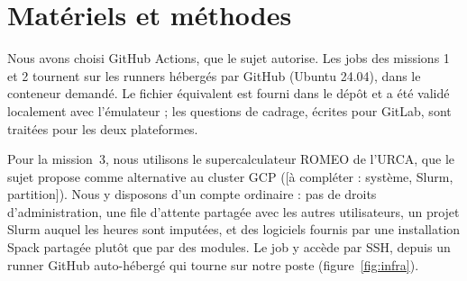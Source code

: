 \documentclass[11pt,a4paper]{article}
\newcommand{\romeoinfo}{\afaire{système, Slurm, partition}}
\newcommand{\fic}[1]{\code{#1}}
\newcommand{\afaire}[1]{\textcolor{red!70!black}{[à compléter : #1]}}
\begin{document}
\section{Matériels et méthodes}

Nous avons choisi GitHub Actions, que le sujet autorise. Les jobs des missions 1 et 2 tournent
sur les runners hébergés par GitHub (Ubuntu 24.04), dans le conteneur 
demandé. Le fichier \fic{.gitlab-ci.yml} équivalent est fourni dans le dépôt et a été validé
localement avec l'émulateur  ; les questions de cadrage, écrites pour
GitLab, sont traitées pour les deux plateformes.

Pour la mission~3, nous utilisons le supercalculateur ROMEO de l'URCA, que le sujet propose
comme alternative au cluster GCP (\romeoinfo). Nous y disposons d'un compte ordinaire : pas de
droits d'administration, une file d'attente partagée avec les autres utilisateurs, un projet
Slurm auquel les heures sont imputées, et des logiciels fournis par une installation Spack
partagée plutôt que par des modules. Le job  y accède par SSH, depuis un runner
GitHub auto-hébergé qui tourne sur notre poste (figure~\ref{fig:infra}).
\end{document}

